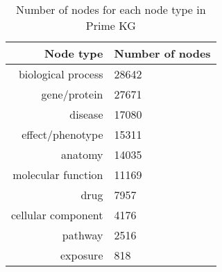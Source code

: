 \begin{table}
    \centering
    \begin{tabular}{rl}
        \toprule
        \textbf{Node type} & \textbf{Number of nodes}\\
        \midrule
        biological process & 28642\\
        gene/protein & 27671\\
        disease & 17080\\
        effect/phenotype & 15311\\
        anatomy & 14035\\
        molecular function & 11169\\
        drug & 7957\\
        cellular component & 4176\\
        pathway & 2516\\
        exposure & 818\\
        \bottomrule
    \end{tabular}
    \caption{Number of nodes for each node type in Prime KG}\label{tab:primekg_node_types}
\end{table}
